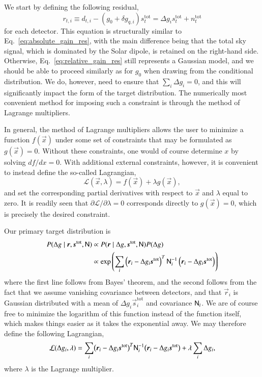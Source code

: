 \documentclass[twocolumn]{aa}
\newcommand{\s}[0]{\vec{s}}
\newcommand{\N}[0]{\tens{N}}
\renewcommand{\r}[0]{\vec{r}}
\newcommand{\x}[0]{\vec{x}}
\newcommand{\tot}[0]{^{\mathrm{tot}}}
\begin{document}
We start by defining the following residual,
\begin{equation}
    r_{t,i} \equiv d_{t,i} - (g_0 + \delta{g}_{q,i})s_t^{\mathrm{tot}} = \Delta g_i s_t^{\mathrm{tot}} + n_t^{\mathrm{tot}}
    \label{eq:relative_gain_res}
\end{equation}
for each detector. This equation is structurally similar to
Eq.~\eqref{eq:absolute_gain_res}, with the main difference being that
the total sky signal, which is dominated by the Solar dipole, is
retained on the right-hand side. Otherwise,
Eq.~\eqref{eq:relative_gain_res} still represents a Gaussian model,
and we should be able to proceed similarly as for $g_0$ when drawing
from the conditional distribution. We do, however, need to ensure that
$\sum_i \Delta g_i=0$, and this will significantly impact the form of
the target distribution. The numerically most convenient method for
imposing such a constraint is through the method of Lagrange
multipliers.


In general, the method of Lagrange multipliers allows the user to
minimize a function $f(\x)$ under some set of constraints that may be
formulated as $g(\x) = 0$. Without these constraints, one would of
course determine $x$ by solving $df/dx=0$. With additional
external constraints, however, it is convenient to instead define the
so-called Lagrangian,
\begin{equation}
    \mathcal{L}(\x, \lambda) = f(\x) + \lambda g(\x),
    \label{eq:lagrangian}
\end{equation}
and set the corresponding partial derivatives with
respect to $\x$ and $\lambda$ equal to zero. It is readily seen that
$\partial\mathcal{L}/\partial \lambda = 0$ corresponds
directly to $g(\x) = 0$, which is precisely the desired
constraint.

Our primary target distribution is
\begin{align}
    P(\Delta g \mid \r, \s\tot, \N) &\propto P(\r \mid\Delta g, \s\tot, \N)P(\Delta g) \nonumber \\
    &\propto \exp\left(\sum_i\left(\r_i - \Delta g_i \s^{\mathrm{tot}}\right)^T\N_i^{-1}\left(\r_i - \Delta g_i\s^{\mathrm{tot}}\right)\right)
\end{align}
where the first line follows from Bayes' theorem, and the second
follows from the fact that we assume vanishing covariance between
detectors, and that $\r_i$ is Gaussian distributed with a mean of
$\Delta g_i \s\tot_i$ and covariance $\N_i$. We are of course free to minimize
the logarithm of this function instead of the function itself, which
makes things easier as it takes the exponential away. We may
therefore define the following Lagrangian,
\begin{equation}
    \mathcal{L}(\Delta g_i, \lambda) = \sum_i\bigl(\r_i - \Delta g_i \s^{\mathrm{tot}}\bigr)^T\N_i^{-1}\bigl(\r_i - \Delta g_i\s^{\mathrm{tot}}\bigr) + \lambda\sum_i \Delta g_i,
\end{equation}
where $\lambda$ is the Lagrange multiplier. 
\end{document}
